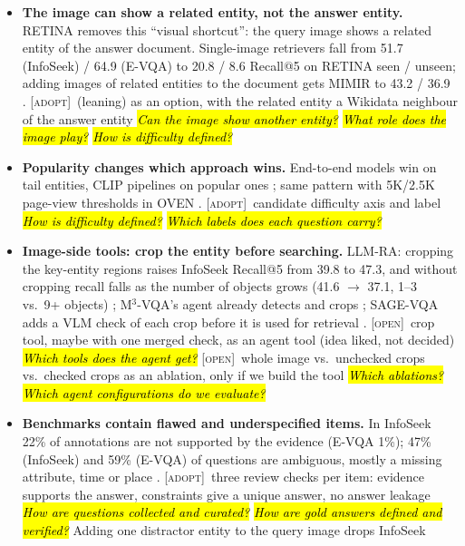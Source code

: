 \documentclass[10pt,a4paper]{article}
\newcommand{\adopt}{\textsc{[adopt]}}
\newcommand{\open}{\textsc{[open]}}
\newcommand{\q}[1]{\hl{\footnotesize\itshape #1}}
\begin{document}
\begin{itemize}
{    exist?} -- gold SPARQL is our difference.
  \item \textbf{The image can show a related entity, not the answer
    entity.} RETINA removes this ``visual shortcut'': the query image
    shows a related entity of the answer document.
    Single-image retrievers fall from 51.7 (InfoSeek) / 64.9 (E-VQA)
    to 20.8 / 8.6 Recall@5 on RETINA seen / unseen; adding images of
    related entities to the document gets MIMIR to 43.2 / 36.9
    \cite[Table 1]{lee2025breaking}.
    \adopt\ (leaning) as an option, with the related entity a Wikidata
    neighbour of the answer entity \q{Can the image show another
    entity?} \q{What role does the image play?} \q{How is difficulty defined?}
  \item \textbf{Popularity changes which approach wins.} End-to-end
    models win on tail entities, CLIP pipelines on popular ones
    \cite[\S\,5.2, Fig.~7]{chen2023can}; same pattern with 5K/2.5K
    page-view thresholds in OVEN \cite[Fig.~6]{hu2023open}.
    \adopt\ candidate difficulty axis and label \q{How is difficulty
    defined?} \q{Which labels does each question carry?}
  \item \textbf{Image-side tools: crop the entity before searching.}
    LLM-RA: cropping the key-entity regions raises InfoSeek
    Recall@5 from 39.8 to 47.3, and without cropping recall falls as
    the number of objects grows (41.6 $\to$ 37.1, 1--3 vs.\ 9+
    objects) \cite[Tables 3--4]{jian2024large}; M$^3$-VQA's agent
    already detects and crops \cite[\S\,5.4]{ma2026m3}; SAGE-VQA
    adds a VLM check of each crop before it is used for retrieval
    \cite[\S\,3.2, App.~A.7]{shen2026sage}. \open\ crop tool, maybe
    with one merged check, as an agent tool (idea liked, not decided)
    \q{Which tools does the
    agent get?} \open\ whole image vs.\ unchecked crops vs.\ checked
    crops as an ablation, only if we build the tool \q{Which ablations?}
    \q{Which agent configurations do we evaluate?}
  \item \textbf{Benchmarks contain flawed and underspecified items.}
    In InfoSeek 22\% of annotations are not supported by the evidence
    (E-VQA 1\%); 47\% (InfoSeek) and 59\% (E-VQA) of questions are
    ambiguous, mostly a missing attribute, time or place
    \cite[\S\,3.1--3.2]{ma2026identifying}. \adopt\ three review
    checks per item: evidence supports the answer, constraints give a
    unique answer, no answer leakage \q{How are questions collected and
    curated?} \q{How are gold answers defined and verified?}
    Adding one distractor entity to the query image drops InfoSeek

\end{itemize}
\end{document}
